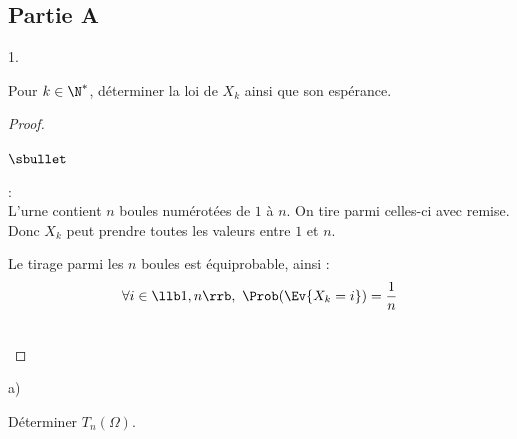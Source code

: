 \documentclass[11pt]{article}%
\begin{document}
\subsection*{Partie A}

\begin{noliste}{1.}
\item Pour $k\in\N^*$, déterminer la loi de $X_k$ ainsi que son espérance.
  
  \begin{proof}~
    \begin{noliste}{$\sbullet$}
    \item {} :\\
      L'urne contient $n$ boules numérotées de $1$ à $n$. On tire
      parmi celles-ci avec remise.\\
      Donc $X_k$ peut prendre toutes les valeurs entre $1$ et $n$.
    \item Le tirage parmi les $n$ boules est équiprobable, ainsi :
      \[
      \forall i \in\llb 1,n\rrb, \ \Prob(\Ev{X_k=i})=\dfrac{1}{n}
      \]
    \end{noliste}




    ~\\[-1.4cm]
  \end{proof}
  

\item \begin{noliste}{a)}
  \item Déterminer $T_n(\Omega)$.
    

\end{noliste}
\end{noliste}
\end{document}
